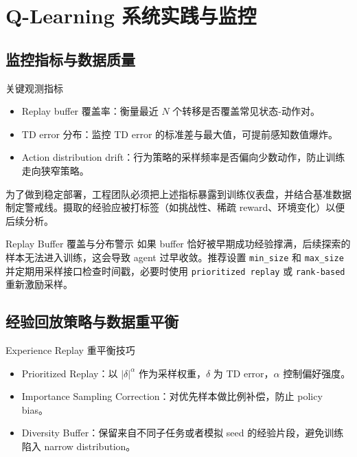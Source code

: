 \section{Q-Learning 系统实践与监控}

\subsection{监控指标与数据质量}

\begin{knowledgebox}{关键观测指标}
\begin{itemize}
    \item Replay buffer 覆盖率：衡量最近 $N$ 个转移是否覆盖常见状态-动作对。
    \item TD error 分布：监控 TD error 的标准差与最大值，可提前感知数值爆炸。
    \item Action distribution drift：行为策略的采样频率是否偏向少数动作，防止训练走向狭窄策略。
\end{itemize}
\end{knowledgebox}

为了做到稳定部署，工程团队必须把上述指标暴露到训练仪表盘，并结合基准数据制定警戒线。摄取的经验应被打标签（如挑战性、稀疏 reward、环境变化）以便后续分析。

\begin{importantbox}{Replay Buffer 覆盖与分布警示}
如果 buffer 恰好被早期成功经验撑满，后续探索的样本无法进入训练，这会导致 agent 过早收敛。推荐设置 \texttt{min\_size} 和 \texttt{max\_size} 并定期用采样接口检查时间戳，必要时使用 \texttt{prioritized replay} 或 \texttt{rank-based} 重新激励采样。
\end{importantbox}

\subsection{经验回放策略与数据重平衡}

\begin{knowledgebox}{Experience Replay 重平衡技巧}
\begin{itemize}
    \item Prioritized Replay：以 $|\delta|^\alpha$ 作为采样权重，$\delta$ 为 TD error，$\alpha$ 控制偏好强度。
    \item Importance Sampling Correction：对优先样本做比例补偿，防止 policy bias。
    \item Diversity Buffer：保留来自不同子任务或者模拟 seed 的经验片段，避免训练陷入 narrow distribution。
\end{itemize}
\end{knowledgebox}

